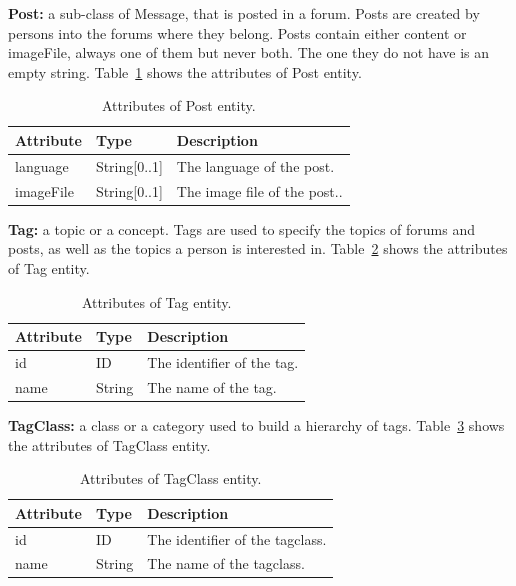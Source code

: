 {\flushleft \textbf{Post:}} a sub-class of Message, that is posted in a
forum. Posts are created by persons into the forums where they belong. 
Posts contain either content or imageFile, always one of them but never both.
The one they do not have is an empty string.
Table~\ref{table:post} shows the attributes of Post entity.

\begin{table}[H]
    \begin{tabular}{|p{2.5cm}|p{2.5cm}|p{10.5cm}|}
        \hline
        \textbf{Attribute} & \textbf{Type} & \textbf{Description} \\
        \hline
        language & String[0..1]  & The language of the post.\\
        \hline
        imageFile & String[0..1]  & The image file of the post..\\
        \hline
    \end{tabular}
    \caption{Attributes of Post entity.}
    \label{table:post}
\end{table}

{\flushleft \textbf{Tag:}} a topic or a concept. Tags are used to
specify the topics of forums and posts, as well as the topics a person is
interested in. Table~\ref{table:tag} shows the attributes of Tag entity.

\begin{table}[H]
    \begin{tabular}{|p{2.5cm}|p{2.5cm}|p{10.5cm}|}
        \hline
        \textbf{Attribute} & \textbf{Type} & \textbf{Description} \\
        \hline
        id & ID  & The identifier of the tag.\\
        \hline
        name & String  &  The name of the tag.\\
        \hline
    \end{tabular}
    \caption{Attributes of Tag entity.}
    \label{table:tag}
\end{table}

{\flushleft \textbf{TagClass:}} a class or a category used to build
a hierarchy of tags. Table~\ref{table:tagclass} shows the attributes of TagClass
entity.

\begin{table}[H]
    \begin{tabular}{|p{2.5cm}|p{2.5cm}|p{10.5cm}|}
        \hline
        \textbf{Attribute} & \textbf{Type} & \textbf{Description} \\
        \hline
        id & ID  & The identifier of the tagclass.\\
        \hline
        name & String  &  The name of the tagclass.\\
        \hline
    \end{tabular}
    \caption{Attributes of TagClass entity.}
    \label{table:tagclass}
\end{table}

